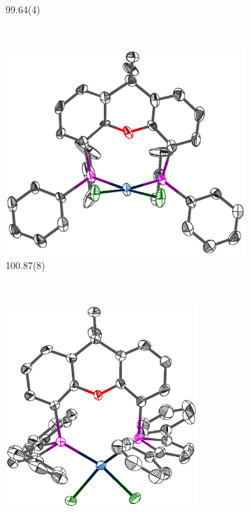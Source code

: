 \begin{figure}[htbp]
\begin{subfigure}[b]{0.45\textwidth}
                \caption{99.64(4)\degrees{}\cite{Duren2006}}
                \label{PtCl2BINAP}
        \end{subfigure}
        \\
        \begin{subfigure}[b]{0.45\textwidth}
                \includegraphics[width=\textwidth]{../Othercrystals/PtCl2/730506.eps}
                \caption{100.87(8)\degrees{}\cite{Niksch2010}}
                \label{PtCl2Cy}
        \end{subfigure}%
        ~ 
        \begin{subfigure}[b]{0.45\textwidth}
                \includegraphics[width=0.8\textwidth]{../Othercrystals/PtCl2/687181.eps}

\end{subfigure}
\end{figure}
